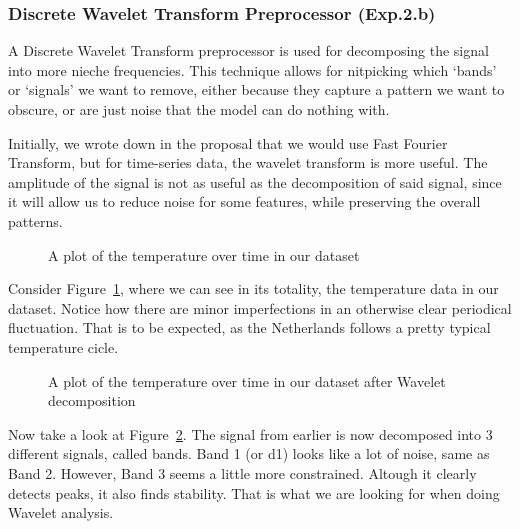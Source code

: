 \subsubsection{Discrete Wavelet Transform Preprocessor (Exp.2.b)}
A Discrete Wavelet Transform preprocessor is used for decomposing the signal into more nieche frequencies. This technique allows for nitpicking which `bands' or `signals' we want to remove, either because they capture a pattern we want to obscure, or are just noise that the model can do nothing with.

Initially, we wrote down in the proposal that we would use Fast Fourier Transform, but for time-series data, the wavelet transform is more useful. The amplitude of the signal is not as useful as the decomposition of said signal, since it will allow us to reduce noise for some features, while preserving the overall patterns.

\begin{figure}[htbp]
    \centering
    \resizebox{0.7\textwidth}{!}{
        
    }
    \caption{A plot of the temperature over time in our dataset}\label{fig:tempOrig}
\end{figure}

Consider Figure~\ref{fig:tempOrig}, where we can see in its totality, the temperature data in our dataset.
Notice how there are minor imperfections in an otherwise clear periodical fluctuation. That is to be expected,
as the Netherlands follows a pretty typical temperature cicle.

\begin{figure}[htbp]
    \centering
    \resizebox{\textwidth}{!}{
        
    }
    \caption{A plot of the temperature over time in our dataset after Wavelet decomposition}\label{fig:tempDecomp}
\end{figure}

Now take a look at Figure~\ref{fig:tempDecomp}. The signal from earlier is now decomposed into 3 different signals, called bands.
Band 1 (or d1) looks like a lot of noise, same as Band 2. However, Band 3 seems a little more constrained.
Altough it clearly detects peaks, it also finds stability. That is what we are looking for when doing Wavelet analysis.

